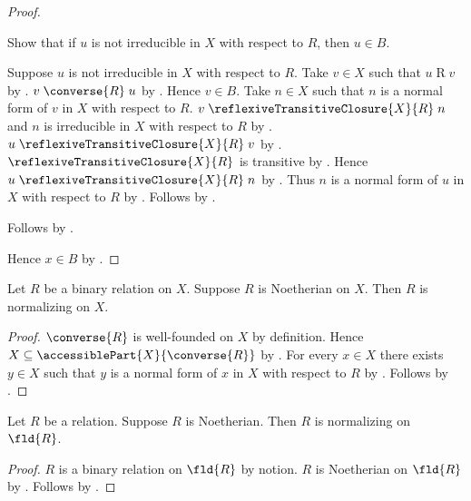 \begin{proof}
\begin{subproof}
\begin{subproof}
            Show that if $u$ is not irreducible in $X$ with respect to $R$,
                then $u\in B$.
            \begin{subproof}
                Suppose $u$ is not irreducible in $X$ with respect to $R$.
                Take $v\in X$ such that $u\mathrel{R}v$
                    by .
                $v\mathrel{\converse{R}}u$ by .
                Hence $v\in B$.
                Take $n\in X$ such that
                    $n$ is a normal form of $v$ in $X$ with respect to $R$.
                $v\mathrel{\reflexiveTransitiveClosure{X}{R}}n$ and
                    $n$ is irreducible in $X$ with respect to $R$
                    by .
                $u\mathrel{\reflexiveTransitiveClosure{X}{R}}v$
                    by .
                $\reflexiveTransitiveClosure{X}{R}$ is transitive
                    by .
                Hence $u\mathrel{\reflexiveTransitiveClosure{X}{R}}n$
                    by .
                Thus $n$ is a normal form of $u$ in $X$ with respect to $R$
                    by .
                Follows by \auto.
            \end{subproof}
        \end{subproof}
        Follows by .
    \end{subproof}
    Hence $x\in B$ by .
\end{proof}

\begin{corollary}\label{noetherian_on_implies_normalizing_on}
    Let $R$ be a binary relation on $X$.
    Suppose $R$ is Noetherian on $X$.
    Then $R$ is normalizing on $X$.
\end{corollary}
\begin{proof}
    $\converse{R}$ is well-founded on $X$ by definition.
    Hence $X\subseteq\accessiblePart{X}{\converse{R}}$
        by .
    For every $x\in X$ there exists $y\in X$ such that
        $y$ is a normal form of $x$ in $X$ with respect to $R$
        by .
    Follows by .
\end{proof}

\begin{corollary}\label{noetherian_implies_normalizing_on_field}
    Let $R$ be a relation.
    Suppose $R$ is Noetherian.
    Then $R$ is normalizing on $\fld{R}$.
\end{corollary}
\begin{proof}
    $R$ is a binary relation on $\fld{R}$ by notion.
    $R$ is Noetherian on $\fld{R}$
        by .
    Follows by .
\end{proof}
